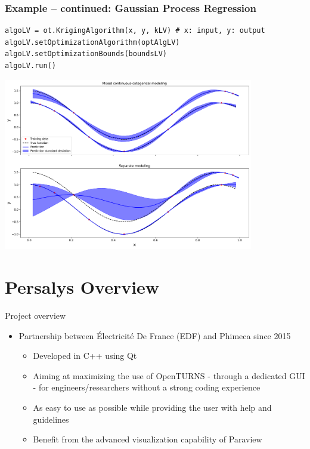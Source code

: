\documentclass{beamer}
\begin{document}
\begin{frame}[containsverbatim]
  \frametitle{Example -- continued: Gaussian Process Regression}
\small


\begin{lstlisting}
algoLV = ot.KrigingAlgorithm(x, y, kLV) # x: input, y: output
algoLV.setOptimizationAlgorithm(optAlgLV)
algoLV.setOptimizationBounds(boundsLV)
algoLV.run()
\end{lstlisting}
\vspace{-0.19cm}
\centering
\includegraphics[width=0.82\textwidth]{figures/latent_variable_model.pdf}

\end{frame}

\section{Persalys Overview}
\begin{frame}{Project overview}
  \begin{itemize}
  \item
    Partnership between \'Electricit\'e De France (EDF) and Phimeca since 2015
  
    \begin{itemize}
    \item
      Developed in C++ using Qt
    \item
      Aiming at maximizing the use of OpenTURNS - through a dedicated GUI
      - for engineers/researchers without a strong coding experience
    \item
      As easy to use as possible while providing the user with help and
      guidelines
    \item
      Benefit from the advanced visualization capability of
      Paraview
    \end{itemize}
  \end{itemize}
  \end{frame}
  
\end{document}
